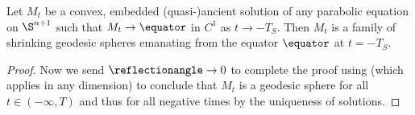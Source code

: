 \documentclass[12pt]{amsart}
\begin{document}
\begin{theorem}
\label{thm:classification}
Let \(M_t\) be a convex, embedded (quasi-)ancient solution of any parabolic equation on \(\S^{n+1}\) such that \(M_t \to \equator\) in \(C^1\) as \(t \to -T_S\). Then \(M_t\) is a family of shrinking geodesic spheres emanating from the equator \(\equator\) at \(t=-T_S\).
\end{theorem}

\begin{proof}
Now we send \(\reflectionangle \to 0\) to complete the proof using \cite[Proposition 5.3]{bryanlouie} (which applies in any dimension) to conclude that \(M_t\) is a geodesic sphere for all \(t \in (-\infty, T)\) and thus for all negative times by the uniqueness of solutions.
\end{proof}




\end{document}
